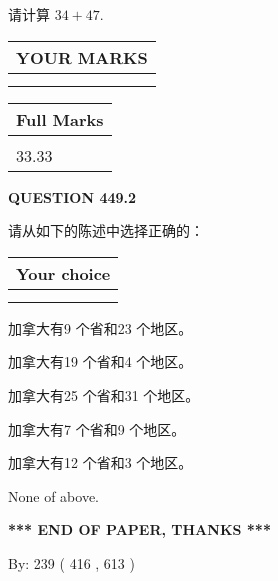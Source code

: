 \documentclass{ctexart}
\begin{document}
  
 
请计算 $ %
34 +  %
47 $.
 

 

 
  
\vspace{0.2in}
  
\noindent\begin{tabular}{|l|}
\hline
 YOUR MARKS  \\
\hline
 \\ 
 \\ 
\hline
\end{tabular}
\hspace{0.05in} \begin{tabular}{|l|}
\hline
 Full Marks  \\
\hline
 \\ 
33.33 \\
\hline
\end{tabular}
{\textbf{\Large{QUESTION
449.2 
}}}
  
  
请从如下的陈述中选择正确的：
  
  
\noindent\hspace{3.0in} \begin{tabular}{|l|}
\hline
Your choice \\
\hline
 \\ 
 \\ 
\hline
\end{tabular}
  
  
 
 
加拿大有9 个省和23 个地区。
 
 
加拿大有19 个省和4 个地区。
 
 
加拿大有25 个省和31 个地区。
 
 
加拿大有7 个省和9 个地区。
 
 
加拿大有12 个省和3 个地区。
 
 
 None of above.
 
 
   
   
 \vspace{0.2in}
 
   
   
   
   
\vspace{1.0in} 
{\textbf{\large{ *** END OF PAPER, THANKS *** }}} 
   
   
\hspace{1.0in} By: 
 239 ( 416 ,  613 )
   
\end{document}
